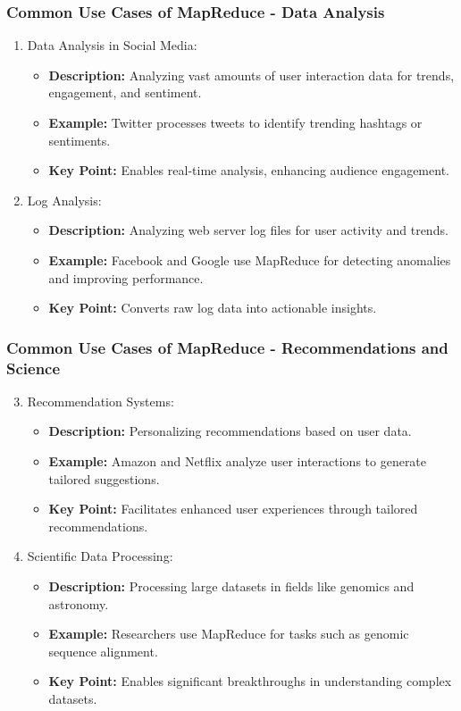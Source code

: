 \documentclass[aspectratio=169]{beamer}
\begin{document}
\begin{frame}[fragile]
    \frametitle{Common Use Cases of MapReduce - Data Analysis}
    \begin{enumerate}
        \item Data Analysis in Social Media:
        \begin{itemize}
            \item \textbf{Description:} Analyzing vast amounts of user interaction data for trends, engagement, and sentiment.
            \item \textbf{Example:} Twitter processes tweets to identify trending hashtags or sentiments.
            \item \textbf{Key Point:} Enables real-time analysis, enhancing audience engagement.
        \end{itemize}
        
        \item Log Analysis:
        \begin{itemize}
            \item \textbf{Description:} Analyzing web server log files for user activity and trends.
            \item \textbf{Example:} Facebook and Google use MapReduce for detecting anomalies and improving performance.
            \item \textbf{Key Point:} Converts raw log data into actionable insights.
        \end{itemize}
    \end{enumerate}
\end{frame}

\begin{frame}[fragile]
    \frametitle{Common Use Cases of MapReduce - Recommendations and Science}
    \begin{enumerate}
        \setcounter{enumi}{2}
        \item Recommendation Systems:
        \begin{itemize}
            \item \textbf{Description:} Personalizing recommendations based on user data.
            \item \textbf{Example:} Amazon and Netflix analyze user interactions to generate tailored suggestions.
            \item \textbf{Key Point:} Facilitates enhanced user experiences through tailored recommendations.
        \end{itemize}
        
        \item Scientific Data Processing:
        \begin{itemize}
            \item \textbf{Description:} Processing large datasets in fields like genomics and astronomy.
            \item \textbf{Example:} Researchers use MapReduce for tasks such as genomic sequence alignment.
            \item \textbf{Key Point:} Enables significant breakthroughs in understanding complex datasets.
        \end{itemize}
    \end{enumerate}
\end{frame}
\end{document}
